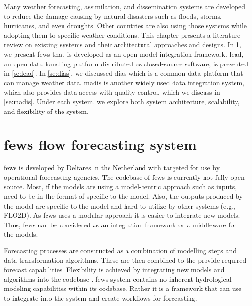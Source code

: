 Many weather forecasting, assimilation, and dissemination systems are developed to reduce the damage causing by natural disasters such as floods, storms, hurricanes, and even droughts. %
Other countries are also using those systems while adopting them %
to specific weather conditions.%
This chapter presents a literature review on existing systems and their architectural approaches and designs. In \cref{se:fews}, we present \acrfull{fews} that is developed as an open model integration framework. \acrfull{lead}, an open data handling platform distributed as closed-source software, is presented in \cref{se:lead}. %
In \cref{se:dias}, we discussed \acrfull{dias} which is a common data platform that can manage weather data. \acrfull{madis} is another widely used data integration system, which also provides data access with quality control, which we discuss in \cref{se:madis}.
Under each system, we explore both system architecture, scalability, and flexibility of the system.



\section{\acrshort{fews} flow forecasting system}
\label{se:fews}

\acrshort{fews} \cite{Werner2013TheSystem} is developed by Deltares in the Netherland with targeted for use by operational forecasting agencies. The codebase of \acrshort{fews} is currently not fully open source.
Most, if the models are using a model-centric approach such as inputs, need to be in the format of specific to the model. Also, the outputs produced by the model are specific to the model and hard to utilize by other systems (e.g., FLO2D). As \acrshort{fews} uses a modular approach it is easier to integrate new models. 
Thus, \acrshort{fews} can be considered as an integration framework or a middleware for the models.

Forecasting processes are constructed as a combination of modelling steps and data transformation algorithms. These are then combined to the provide required forecast capabilities. Flexibility is achieved by integrating new models and algorithms into the codebase \cite{Werner2013TheSystem}. \acrshort{fews} system contains no inherent hydrological modeling capabilities within its codebase. Rather it is a framework that can use to integrate into the system and create workflows for forecasting.

